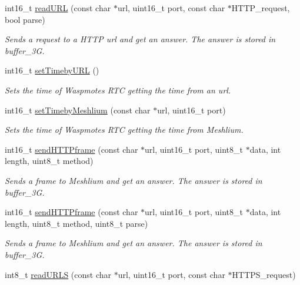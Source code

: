 \begin{DoxyCompactItemize}
int16\+\_\+t \hyperlink{class_wasp3_g_a493627976ed3719ca7971d6bc5a604fe}{read\+U\+RL} (const char $\ast$url, uint16\+\_\+t port, const char $\ast$H\+T\+T\+P\+\_\+request, bool parse)
\begin{DoxyCompactList}\small\item\em Sends a request to a H\+T\+TP url and get an answer. The answer is stored in \textquotesingle{}buffer\+\_\+3G\textquotesingle{}. \end{DoxyCompactList}\item 
int16\+\_\+t \hyperlink{class_wasp3_g_a8ddcf6b62a01e68e66038c9e02cdc248}{set\+Timeby\+U\+RL} ()
\begin{DoxyCompactList}\small\item\em Sets the time of Waspmote\textquotesingle{}s R\+TC getting the time from an url. \end{DoxyCompactList}\item 
int16\+\_\+t \hyperlink{class_wasp3_g_a8bbae089cc4157d4ea755367bee4c283}{set\+Timeby\+Meshlium} (const char $\ast$url, uint16\+\_\+t port)
\begin{DoxyCompactList}\small\item\em Sets the time of Waspmote\textquotesingle{}s R\+TC getting the time from Meshlium. \end{DoxyCompactList}\item 
int16\+\_\+t \hyperlink{class_wasp3_g_a57e564d6de3fafaa2ca31eec4c5821c7}{send\+H\+T\+T\+Pframe} (const char $\ast$url, uint16\+\_\+t port, uint8\+\_\+t $\ast$data, int length, uint8\+\_\+t method)
\begin{DoxyCompactList}\small\item\em Sends a frame to Meshlium and get an answer. The answer is stored in \textquotesingle{}buffer\+\_\+3G\textquotesingle{}. \end{DoxyCompactList}\item 
int16\+\_\+t \hyperlink{class_wasp3_g_a076a69fd1f6aa33b1a7833694048fbf4}{send\+H\+T\+T\+Pframe} (const char $\ast$url, uint16\+\_\+t port, uint8\+\_\+t $\ast$data, int length, uint8\+\_\+t method, uint8\+\_\+t parse)
\begin{DoxyCompactList}\small\item\em Sends a frame to Meshlium and get an answer. The answer is stored in \textquotesingle{}buffer\+\_\+3G\textquotesingle{}. \end{DoxyCompactList}\item 
int8\+\_\+t \hyperlink{class_wasp3_g_a9c6ab72a28b62e13e91a11efac7c2f10}{read\+U\+R\+LS} (const char $\ast$url, uint16\+\_\+t port, const char $\ast$H\+T\+T\+P\+S\+\_\+request)

\end{DoxyCompactItemize}
